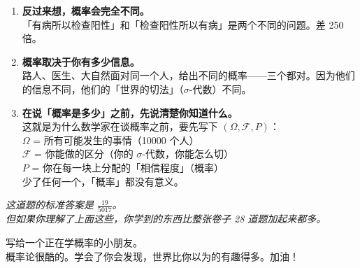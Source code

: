 \documentclass[12pt,a4paper]{article}
\begin{document}
\begin{mathbox}[三件事]
\begin{enumerate}[label=\textbf{\arabic*.}, leftmargin=2em, itemsep=8pt]
  \item \textbf{反过来想，概率会完全不同。}\\
  「有病所以检查阳性」和「检查阳性所以有病」是两个不同的问题。差 250 倍。

  \item \textbf{概率取决于你有多少信息。}\\
  路人、医生、大自然面对同一个人，给出不同的概率——三个都对。因为他们的信息不同，他们的「世界的切法」（$\sigma$-代数）不同。

  \item \textbf{在说「概率是多少」之前，先说清楚你知道什么。}\\
  这就是为什么数学家在谈概率之前，要先写下 $(\Omega, \mathcal{F}, P)$：\\
  $\Omega$ = 所有可能发生的事情（10000 个人）\\
  $\mathcal{F}$ = 你能做的区分（你的 $\sigma$-代数，你能怎么切）\\
  $P$ = 你在每一块上分配的「相信程度」（概率）\\[4pt]
  少了任何一个，「概率」都没有意义。
\end{enumerate}
\end{mathbox}

\vspace{1cm}
\begin{center}
\textit{\small 这道题的标准答案是 $\frac{19}{5017}$。}\\[4pt]
\textit{\small 但如果你理解了上面这些，你学到的东西比整张卷子 28 道题加起来都多。}
\end{center}

\vfill
\begin{center}
\footnotesize\sffamily\color{gray}
写给一个正在学概率的小朋友。\\
概率论很酷的。学会了你会发现，世界比你以为的有趣得多。加油！
\end{center}
\end{document}
